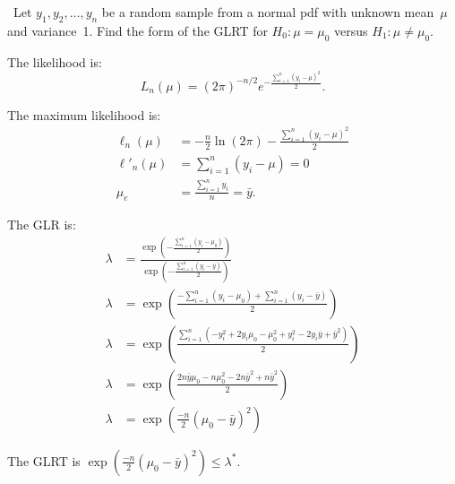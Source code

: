 \begin{problem}
  ~Let ${y_1,y_2,\ldots,y_n}$ be a random sample from a normal pdf with unknown mean~$\mu$ and variance~1.  Find the form of the GLRT for ${H_0: \mu = \mu_0}$ versus ${H_1: \mu \ne \mu_0}$.
\end{problem}

The likelihood is:
\begin{equation}
  L_{n}(\mu) = \left( 2 \pi \right)^{-n/2} e^{-\frac{\sum_{i=1}^{n}(y_i - \mu)^2}{2}} \text{.}
\end{equation}

The maximum likelihood is:
\begin{align}
  \ell_{n}(\mu)  &= -\frac{n}{2} \ln(2\pi) - \frac{\sum_{i=1}^{n} (y_i - \mu)^2}{2} \\
  \ell'_{n}(\mu) &=  \sum_{i=1}^{n} (y_i - \mu) = 0 \\
           \mu_e &= \frac{\sum_{i=1}^{n} y_i}{n} = \bar{y} \text{.}
\end{align}

The GLR is:
\begin{align}
  \lambda &= \frac{\exp\left( -\frac{\sum_{i=1}^{n} (y_i - \mu_0)}{2} \right)}{\exp\left( -\frac{\sum_{i=1}^{n} (y_i - \bar{y})}{2} \right)} \\
  \lambda &= \exp\left( \frac{ - \sum_{i=1}^{n} (y_i - \mu_0) + \sum_{i=1}^{n} (y_i - \bar{y})}{2} \right) \\
  \lambda &= \exp\left( \frac{\sum_{i=1}^{n} (-y_{i}^{2} + 2y_i \mu_0  - \mu^2_0 + y^2_i - 2y_i \bar{y}  + \bar{y}^2)}{2} \right) \\
  \lambda &= \exp\left( \frac{2n \bar{y} \mu_0  - n\mu^2_0 - 2n\bar{y}^2 + n\bar{y}^2}{2} \right) \\
  \lambda &= \exp\left(\frac{-n}{2} (\mu_0 - \bar{y})^2 \right)
\end{align}

The GLRT is ${\exp\left(\frac{-n}{2} (\mu_0 - \bar{y})^2 \right) \leq \lambda^{*}}$.
